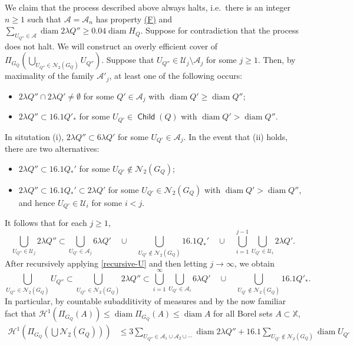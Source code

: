 \documentclass[12pt]{amsart}
\numberwithin{equation}{section}
\theoremstyle{plain}
\theoremstyle{definition}
\def\XX{{\mathbb{X}}}
\newcommand{\diam}{\mathop\mathrm{diam}\nolimits}
\newcommand{\Haus}{\mathcal{H}}
\newcommand{\Child}{\mathop\mathsf{Child}\nolimits}
\numberwithin{figure}{section}
\begin{document}
We claim that the process described above always halts, i.e.~there is an integer $n\geq 1$ such that $\mathcal{A} =\mathcal{A}_n$ has property \hyperref[property-F]{(F)} and $\sum_{U_{Q''} \in \mathcal{A}} \diam 2\lambda Q'' \ge 0.04\diam H_Q$. Suppose for contradiction that the process does not halt. We will construct an overly efficient cover of $\Pi_{G_Q}(\bigcup_{U_{Q''} \in \mathcal{N}_2(G_Q)}U_{Q''})$. Suppose that $U_{Q''}\in\mathcal{U}_j\setminus\mathcal{A}_j$ for some $j\geq 1$. Then, by maximality of the family $\mathcal{A}'_j$, at least one of the following occurs: \begin{itemize}
\item[(i)] $2\lambda Q''\cap 2\lambda Q'\neq\emptyset$ for some $Q'\in\mathcal{A}_j$ with $\diam Q'\geq \diam Q''$;
\item[(ii)] $2\lambda Q''\subset 16.1Q'_*$ for some $U_{Q'}\in \Child(Q)$ with $\diam Q'>\diam Q''$.
\end{itemize} In situtation (i), $2\lambda Q''\subset 6\lambda Q'$ for some $U_{Q'}\in\mathcal{A}_j$. In the event that (ii) holds, there are two alternatives: \begin{itemize}
\item[(iii)] $2\lambda Q'' \subset 16.1Q_*'$ for some $U_{Q'}\not \in\mathcal{N}_2(G_Q)$;
\item[(iv)] $2\lambda Q''\subset 16.1Q_*'\subset 2\lambda Q'$ for some $U_{Q'}\in\mathcal{N}_2(G_Q)$ with $\diam Q'>\diam Q''$, and hence  $U_{Q'}\in\mathcal{U}_{i}$ for some $i<j$.
\end{itemize} It follows that for each $j\geq 1$, \begin{equation}\label{recursive-U} \bigcup_{U_{Q''}\in\mathcal{U}_j} 2\lambda Q'' \subset \bigcup_{U_{Q'}\in\mathcal{A}_j}6\lambda Q' \quad\cup\quad \bigcup_{U_{Q'}\not\in\mathcal{N}_2(G_Q)} 16.1Q_*' \quad\cup\quad \bigcup_{i=1}^{j-1}\bigcup_{U_{Q'}\in\mathcal{U}_{i}} 2\lambda Q'. \end{equation} After recursively applying \eqref{recursive-U} and then letting $j\rightarrow\infty$, we obtain \begin{equation*}\bigcup_{U_{Q''}\in\mathcal{N}_2(G_Q)} U_{Q''}\subset \bigcup_{U_{Q''}\in\mathcal{N}_2(G_Q)} 2\lambda Q'' \subset \bigcup_{i=1}^\infty \bigcup_{U_{Q'}\in\mathcal{A}_i} 6\lambda Q' \quad\cup\quad \bigcup_{U_{Q'}\not\in\mathcal{N}_2(G_Q)} 16.1Q'_*.\end{equation*} In particular, by countable subadditivity of measures and by the now familiar fact that $\Haus^1(\Pi_{G_Q}(A))\leq \diam \Pi_{G_Q}(A)\leq \diam A$ for all Borel sets $A\subset\XX$, \begin{align*} \Haus^1\left(\Pi_{G_Q}\left(\textstyle\bigcup\mathcal{N}_2(G_Q)\right)\right) &\leq 3 \sum_{U_{Q''} \in \mathcal{A}_1\cup\mathcal{A}_2\cup\cdots} \diam 2\lambda Q'' + 16.1\sum_{U_{Q'}\not\in\mathcal{N}_2(G_Q)}\diam U_{Q'}\\

\end{align*}
\end{document}
